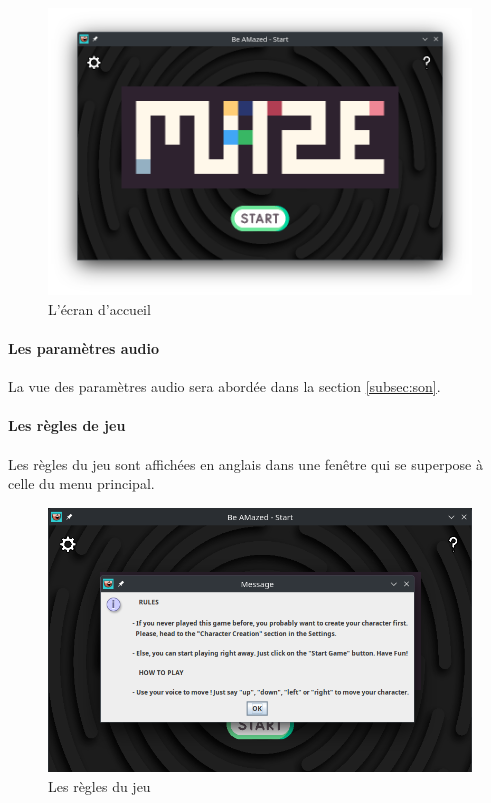 \begin{figure}[h!]
    \centering
    \includegraphics[scale=0.4]{ressources/Implementation/Labyrinthe/Controleur/StartMenu.png}%
    \caption{L'écran d'accueil}
    \label{fig:StartMenu}
\end{figure}
\FloatBarrier

\paragraph{Les paramètres audio}

La vue des paramètres audio sera abordée dans la section \ref{subsec:son}.

\paragraph{Les règles de jeu}

Les règles du jeu sont affichées en anglais dans une fenêtre qui se superpose à celle du menu principal.

\begin{figure}[h!]
    \centering
    \includegraphics[scale=0.4]{ressources/Implementation/Labyrinthe/Controleur/Rules.png}%
    \caption{Les règles du jeu}
    \label{fig:Rules}
\end{figure}
\FloatBarrier

